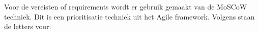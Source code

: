 

















Voor de vereisten of requirements wordt er gebruik gemaakt van de MoSCoW techniek. Dit is een prioritisatie techniek uit het Agile framework. Volgens \textcite{2025agile} staan de letters voor:

